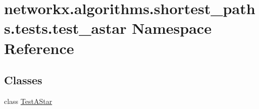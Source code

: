 \hypertarget{namespacenetworkx_1_1algorithms_1_1shortest__paths_1_1tests_1_1test__astar}{}\section{networkx.\+algorithms.\+shortest\+\_\+paths.\+tests.\+test\+\_\+astar Namespace Reference}
\label{namespacenetworkx_1_1algorithms_1_1shortest__paths_1_1tests_1_1test__astar}
\subsection*{Classes}
\begin{DoxyCompactItemize}
\item 
class \hyperlink{classnetworkx_1_1algorithms_1_1shortest__paths_1_1tests_1_1test__astar_1_1TestAStar}{Test\+A\+Star}
\end{DoxyCompactItemize}
